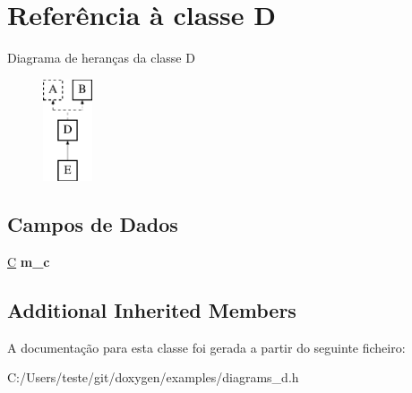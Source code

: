 \hypertarget{class_d}{\section{Referência à classe D}
\label{class_d}
}
Diagrama de heranças da classe D\begin{figure}[H]
\begin{center}
\leavevmode
\includegraphics[height=3.000000cm]{class_d}
\end{center}
\end{figure}
\subsection*{Campos de Dados}
\begin{DoxyCompactItemize}
\item 
\hypertarget{class_d_a2c74ad44b86642512c21365372440c58}{\hyperlink{class_c}{C} {\bfseries m\-\_\-c}}\label{class_d_a2c74ad44b86642512c21365372440c58}

\end{DoxyCompactItemize}
\subsection*{Additional Inherited Members}


A documentação para esta classe foi gerada a partir do seguinte ficheiro\-:\begin{DoxyCompactItemize}
\item 
C\-:/\-Users/teste/git/doxygen/examples/diagrams\-\_\-d.\-h\end{DoxyCompactItemize}

